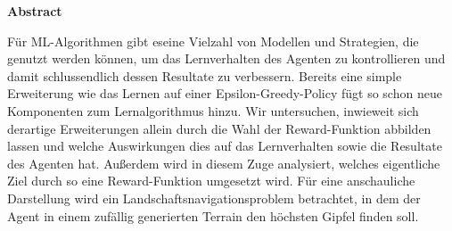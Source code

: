%
%
\vspace*{2cm}

\begin{center}
    \textbf{Abstract}
\end{center}

\vspace*{1cm}


\noindent Für ML-Algorithmen gibt eseine Vielzahl von Modellen und Strategien, die genutzt werden können, um das Lernverhalten des Agenten zu kontrollieren und damit schlussendlich dessen Resultate zu verbessern. Bereits eine simple Erweiterung wie das Lernen auf einer Epsilon-Greedy-Policy fügt so schon neue Komponenten zum Lernalgorithmus hinzu. Wir untersuchen, inwieweit sich derartige Erweiterungen allein durch die Wahl der Reward-Funktion abbilden lassen und welche Auswirkungen dies auf das Lernverhalten sowie die Resultate des Agenten hat. Außerdem wird in diesem Zuge analysiert, welches eigentliche Ziel durch so eine Reward-Funktion umgesetzt wird. Für eine anschauliche Darstellung wird ein Landschaftsnavigationsproblem betrachtet, in dem der Agent in einem zufällig generierten Terrain den höchsten Gipfel finden soll.

